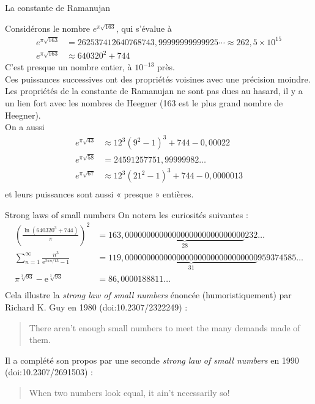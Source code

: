 \documentclass[aspectratio=1610,10pt,dvipsnames]{beamer}
\begin{document}
\begin{frame}{La constante de Ramanujan}

Considérons le nombre $e^{\pi\sqrt{163}}$, qui s'évalue à 
\begin{equation*}
\begin{split}
   e^{\pi\sqrt{163}} &= 262537412640768743,99999999999925\cdots \approx 262,5 \times 10^{15} \\
   e^{\pi\sqrt{163}} &\approx 640320^2 + 744
\end{split}
\end{equation*}
C'est presque un nombre entier, à $10^{-13}$ près. 
\\[0.1em]
Ces puissances successives ont des propriétés voisines avec une précision moindre. 
\\[0.1em]
Les propriétés de la constante de Ramanujan ne sont pas dues au hasard, il y a un lien fort avec 
les nombres de Heegner (163 est le plus grand nombre de Heegner).
\\[0.2em]
On a aussi 
\begin{equation*}
\begin{split}
  e^{\pi {\sqrt {43}}} &\approx 12^{3}(9^{2}-1)^{3}+744-0{,}00022 \\
  e^{\pi\sqrt{58}} &= 24591257751,99999982\dots \\
  {e} ^{\pi {\sqrt {67}}}&\approx 12^{3}(21^{2}-1)^{3}+744-0{,}0000013\\
\end{split}     
\end{equation*}
et leurs puissances sont aussi « presque » entières.
\end{frame}

\begin{frame}{Strong laws of small numbers}
On notera les curiosités suivantes :
\begin{equation*}
\begin{split}
    \left({\frac {\ln(640320^{3}+744)}{\pi }}\right)^{2}& =163{,}
    \underbrace {0000000000000000000000000000} _{28}232\dots \\
    \sum _{n=1}^{\infty }{\frac {n^{3}}{\mathrm {e} ^{2\pi n/13}-1}}&=119{,}\underbrace {0000000000000000000000000000000} _{31}959374585\dots \\
    \pi ^{\sqrt[{3}]{93}}-\mathrm {e} ^{\sqrt[{3}]{93}}&=86{,}0000188811\dots \\
\end{split}
\end{equation*}
Cela illustre la \textit{strong law of small numbers} énoncée (humoristiquement) par Richard K. Guy en 1980 (doi:10.2307/2322249) : 
\begin{quote}
    There aren't enough small numbers to meet the many demands made of them.
\end{quote}
Il a complété son propos par une seconde \textit{strong law of small numbers} en 1990 (doi:10.2307/2691503) :
\begin{quote}
    When two numbers look equal, it ain't necessarily so! 
\end{quote}
\end{frame}
\end{document}
